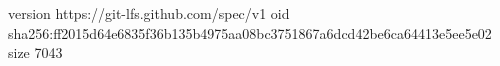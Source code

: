version https://git-lfs.github.com/spec/v1
oid sha256:ff2015d64e6835f36b135b4975aa08bc3751867a6dcd42be6ca64413e5ee5e02
size 7043
